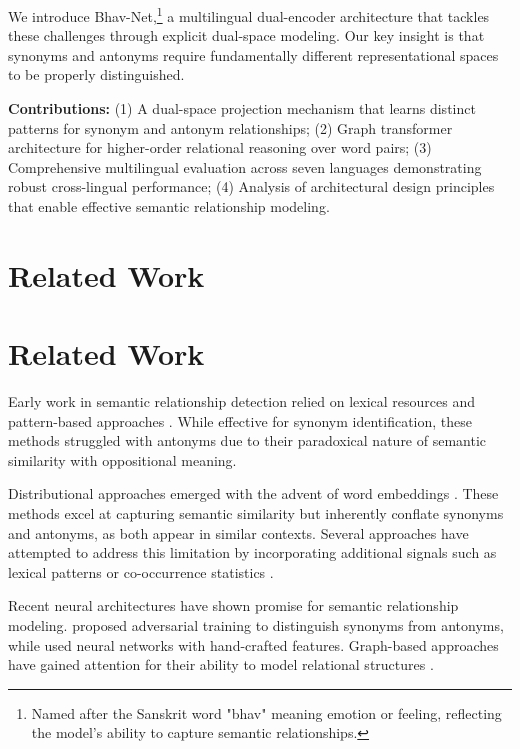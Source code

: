 \documentclass[11pt]{article}
\begin{document}
We introduce Bhav-Net,\footnote{Named after the Sanskrit word "bhav" meaning emotion or feeling, reflecting the model's ability to capture semantic relationships.} a multilingual dual-encoder architecture that tackles these challenges through explicit dual-space modeling. Our key insight is that synonyms and antonyms require fundamentally different representational spaces to be properly distinguished.

\textbf{Contributions:} (1) A dual-space projection mechanism that learns distinct patterns for synonym and antonym relationships; (2) Graph transformer architecture for higher-order relational reasoning over word pairs; (3) Comprehensive multilingual evaluation across seven languages demonstrating robust cross-lingual performance; (4) Analysis of architectural design principles that enable effective semantic relationship modeling.

\section{Related Work}

\section{Related Work}

Early work in semantic relationship detection relied on lexical resources and pattern-based approaches \cite{hearst1992automatic,turney2006similarity}. While effective for synonym identification, these methods struggled with antonyms due to their paradoxical nature of semantic similarity with oppositional meaning.

Distributional approaches emerged with the advent of word embeddings \cite{mikolov2013distributed,pennington2014glove}. These methods excel at capturing semantic similarity but inherently conflate synonyms and antonyms, as both appear in similar contexts. Several approaches have attempted to address this limitation by incorporating additional signals such as lexical patterns \cite{lin2003automatic} or co-occurrence statistics \cite{mohammad2008measuring}.

Recent neural architectures have shown promise for semantic relationship modeling. \citet{chen2018adversarial} proposed adversarial training to distinguish synonyms from antonyms, while \citet{ono2015word} used neural networks with hand-crafted features. Graph-based approaches have gained attention for their ability to model relational structures \cite{speer2017conceptnet,vashishth2018incorporating}.
\end{document}
